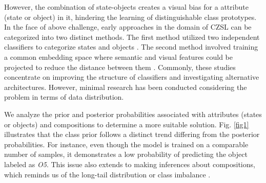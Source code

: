 \documentclass[letterpaper]{article} %
\theoremstyle{definition}
\begin{document}
However, the combination of state-objects creates a visual bias for a attribute (state or object) in it, hindering the learning of distinguishable class prototypes. In the face of above challenge, early approaches in the domain of CZSL can be categorized into two distinct methods. The first method utilized two independent classifiers to categorize states and objects \cite{misra2017red, li2020symmetry, purushwalkam2019task, li2022siamese}. The second method involved training a common embedding space where semantic and visual features could be projected to reduce the distance between them \cite{naeem2021learning, mancini2021open, mancini2022learning}. Commonly, these studies concentrate on improving the structure of classifiers and investigating alternative architectures. However, minimal research has been conducted considering the problem in terms of data distribution.



We analyze the prior and posterior probabilities associated with attributes (states or objects) and compositions to determine a more suitable solution. Fig. \ref{fig1} illustrates that the class prior follows a distinct trend differing from the posterior probabilities. For instance, even though the model is trained on a comparable number of samples, it demonstrates a low probability of predicting the object labeled as \textit{O5}. This issue also extends to making inferences about compositions, which reminds us of the long-tail distribution or class imbalance \cite{menon2020long,tang2020unbiased,kim2020detecting}.
\end{document}
